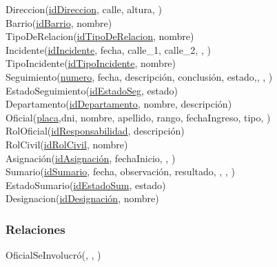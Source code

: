 Direccion(\uline{idDireccion}, calle, altura, )\\

Barrio(\uline{idBarrio}, nombre)\\

TipoDeRelacion(\uline{idTipoDeRelacion}, nombre)\\

Incidente(\uline{idIncidente}, fecha, calle\_1, calle\_2,
, )\\

TipoIncidente(\uline{idTipoIncidente}, nombre)\\

Seguimiento(\uline{numero}, fecha, descripción, conclusión,
estado,, , )\\

EstadoSeguimiento(\uline{idEstadoSeg}, estado) \\

Departamento(\uline{idDepartamento}, nombre, descripción)\\

Oficial(\uline{placa},dni, nombre, apellido, rango, fechaIngreso, tipo,
) \\

RolOficial(\uline{idResponsabilidad}, descripción)\\

RolCivil(\uline{idRolCivil}, nombre)\\

Asignación(\uline{idAsignación}, fechaInicio, , )\\

Sumario(\uline{idSumario}, fecha, observación, resultado, ,
, )\\

EstadoSumario(\uline{idEstadoSum}, estado) \\

Designacion(\uline{idDesignación}, nombre) \\

\subsubsection{Relaciones}\label{relaciones}

OficialSeInvolucró(, , )\\

